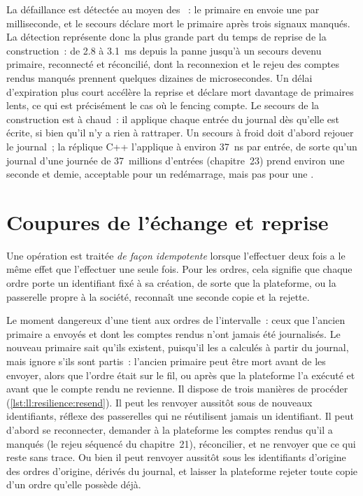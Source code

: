 La défaillance est détectée au moyen des ~: le primaire en envoie une par milliseconde, et le secours déclare mort le primaire après trois
signaux manqués. La détection représente donc la plus grande part du temps de reprise de la construction~: de 2.8 à \qty{3.1}{\milli\second} depuis la panne jusqu'à un secours devenu primaire, reconnecté et réconcilié,
dont la reconnexion et le rejeu des comptes rendus manqués prennent
quelques dizaines de microsecondes. Un délai d'expiration plus court accélère la reprise et déclare mort davantage de primaires lents, ce qui est précisément le cas où le fencing
compte. Le secours de la construction est à chaud~: il applique chaque entrée du journal dès qu'elle est écrite, si bien qu'il n'y a rien à rattraper. Un
secours à froid doit d'abord rejouer le journal~; la réplique C++ l'applique à environ \qty{37}{\nano\second} par entrée, de sorte qu'un journal
d'une journée de 37~millions d'entrées (chapitre~23) prend environ une seconde et demie, acceptable pour un redémarrage, mais pas pour une .

\section{Coupures de l'échange et reprise}

\begin{definition}\label{def:ll:resilience:idempotent}
Une opération est traitée \emph{de façon idempotente} lorsque l'effectuer deux fois a le même effet que
l'effectuer une seule fois. Pour les ordres, cela signifie que chaque ordre porte un identifiant fixé à sa création, de sorte que la plateforme, ou
la passerelle propre à la société, reconnaît une seconde copie et la rejette.
\end{definition}

Le moment dangereux d'une  tient aux ordres de l'intervalle~: ceux que l'ancien primaire a envoyés et dont les comptes rendus n'ont jamais été journalisés.
Le nouveau primaire sait qu'ils existent, puisqu'il les a calculés à partir du journal, mais ignore s'ils sont partis~: l'ancien primaire peut être mort
avant de les envoyer, alors que l'ordre était sur le fil, ou après que la plateforme l'a exécuté et avant que le compte rendu ne revienne. Il
dispose de trois manières de procéder (\cref{lst:ll:resilience:resend}). Il peut les renvoyer aussitôt sous de nouveaux identifiants, réflexe
des passerelles qui ne réutilisent jamais un identifiant. Il peut d'abord se reconnecter, demander à la plateforme les comptes rendus qu'il a manqués (le rejeu séquencé
du chapitre~21), réconcilier, et ne renvoyer que ce qui reste sans trace. Ou bien il peut renvoyer aussitôt sous les identifiants d'origine des ordres
d'origine, dérivés du journal, et laisser la plateforme rejeter toute copie d'un ordre qu'elle possède déjà.

